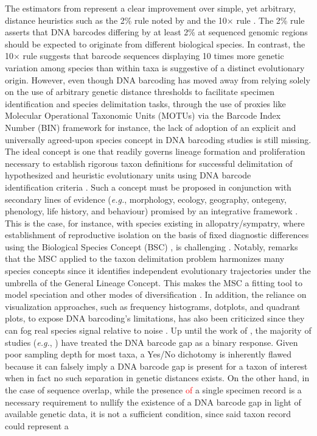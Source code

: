 \documentclass[12pt]{article}
\begin{document}
The estimators from \citet{phillips2024measure} represent a clear improvement over simple, yet arbitrary, distance heuristics such as the 2\% rule noted by \citet{hebert2003biological} and the 10$\times$ rule \citep{hebert2004identification}. The 2\% rule asserts that DNA barcodes differing by at least 2\% at sequenced genomic regions should be expected to originate from different biological species. In contrast, the 10$\times$ rule suggests that barcode sequences displaying 10 times more genetic variation among species than within taxa is suggestive of a distinct evolutionary origin. However, even though DNA barcoding has moved away from relying solely on the use of arbitrary genetic distance thresholds to facilitate specimen identification and species delimitation tasks, through the use of proxies like Molecular Operational Taxonomic Units (MOTUs) via the Barcode Index Number (BIN) framework \citep{ratnasingham2013bin} for instance, the lack of adoption of an explicit and universally agreed-upon species concept in DNA barcoding studies is still missing. The ideal concept is one that readily governs lineage formation and proliferation necessary to establish rigorous taxon definitions for successful delimitation of hypothesized and heuristic evolutionary units using DNA barcode \\ identification criteria \citep{dequeiroz2007species, pante2016species, rannala2015art, wells2022species}. Such a concept must be proposed in conjunction with secondary lines of evidence (\textit{e.g.}, morphology, ecology, geography, ontegeny, phenology, life history, and behaviour) promised by an integrative framework \citep{dayrat2005towards}. This is the case, for instance, with species existing in allopatry/sympatry, where establishment of reproductive isolation on the basis of fixed diagnostic differences using the Biological Species Concept (BSC) \citep{mayr1942systematics}, is challenging \citep{fujita2012coalescent}. Notably, \citet{fujita2012coalescent} remarks that the MSC applied to the taxon delimitation problem harmonizes many species concepts since it identifies independent evolutionary trajectories under the umbrella of the General Lineage Concept. This makes the MSC a fitting tool to model speciation and other modes of diversification \citep{collins2014known}. In addition, the reliance on visualization approaches, such as frequency  histograms, dotplots, and quadrant plots, to expose DNA barcoding's limitations, has also been criticized since they can fog real species signal relative to noise \citep{collins2013seven, phillips2022lack}. Up until the work of \cite{phillips2024measure}, the majority of studies (\textit{e.g.}, \citet{young2021macer}) have treated the DNA barcode gap as a binary response. Given poor sampling depth for most taxa, a Yes/No dichotomy is inherently flawed because it can falsely imply a DNA barcode gap is present for a taxon of interest when in fact no such separation in genetic distances exists. On the other hand, in the case of sequence overlap, while the presence \textcolor{red}{of} a single specimen record is a necessary requirement to nullify the existence of a DNA barcode gap in light of available genetic data, it is not a sufficient condition, since said taxon record could represent a 
\end{document}
